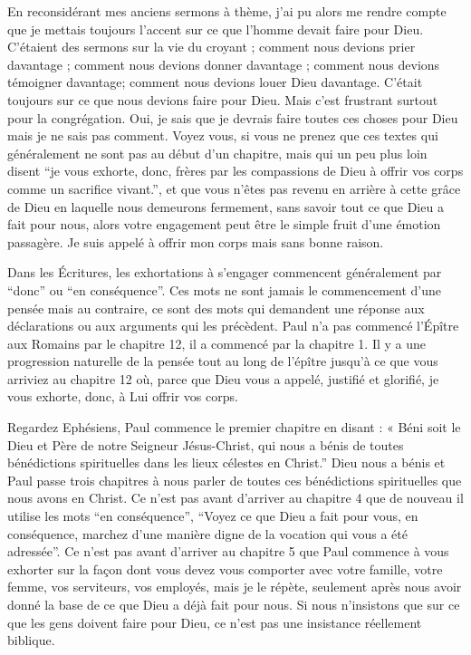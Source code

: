 En reconsidérant mes anciens sermons à thème, j'ai pu alors me rendre compte que je mettais toujours l’accent sur
ce que l’homme devait faire pour Dieu. C’étaient des sermons sur la vie du croyant ; comment nous devions prier
davantage ; comment nous devions donner davantage ; comment nous devions témoigner davantage; comment nous
devions louer Dieu davantage. C’était toujours sur ce que nous devions faire pour Dieu. Mais c’est frustrant surtout
pour la congrégation. Oui, je sais que je devrais faire toutes ces choses pour Dieu mais je ne sais pas comment.
Voyez vous, si vous ne prenez que ces textes qui généralement ne sont pas au début d’un chapitre, mais qui un peu
plus loin disent “je vous exhorte, donc, frères par les compassions de Dieu à offrir vos corps comme un sacrifice
vivant.”, et que vous n’êtes pas revenu en arrière à cette grâce de Dieu en laquelle nous demeurons fermement, sans
savoir tout ce que Dieu a fait pour nous, alors votre engagement peut être le simple fruit d’une émotion passagère. Je
suis appelé à offrir mon corps mais sans bonne raison.

Dans les Écritures, les exhortations à s’engager commencent généralement par “donc” ou “en conséquence”. Ces
mots ne sont jamais le commencement d’une pensée mais au contraire, ce sont des mots qui demandent une réponse
aux déclarations ou aux arguments qui les précèdent.
Paul n’a pas commencé l’Épître aux Romains par le chapitre 12, il a commencé par la chapitre 1. Il y a une
progression naturelle de la pensée tout au long de l’épître jusqu’à ce que vous arriviez au chapitre 12 où, parce que
Dieu vous a appelé, justifié et glorifié, je vous exhorte, donc, à Lui offrir vos corps.

Regardez Ephésiens, Paul commence le premier chapitre en disant : « Béni soit le Dieu et Père de notre Seigneur
Jésus-Christ, qui nous a bénis de toutes bénédictions spirituelles dans les lieux célestes en Christ.” Dieu nous a bénis
et Paul passe trois chapitres à nous parler de toutes ces bénédictions spirituelles que nous avons en Christ. Ce n’est
pas avant d’arriver au chapitre 4 que de nouveau il utilise les mots “en conséquence”, “Voyez ce que Dieu a fait pour
vous, en conséquence, marchez d’une manière digne de la vocation qui vous a été adressée”. Ce n’est pas avant
d’arriver au chapitre 5 que Paul commence à vous exhorter sur la façon dont vous devez vous comporter avec votre
famille, votre femme, vos serviteurs, vos employés, mais je le répète, seulement après nous avoir donné la base de ce
que Dieu a déjà fait pour nous. Si nous n’insistons que sur ce que les gens doivent faire pour Dieu, ce n’est pas une
insistance réellement biblique.

